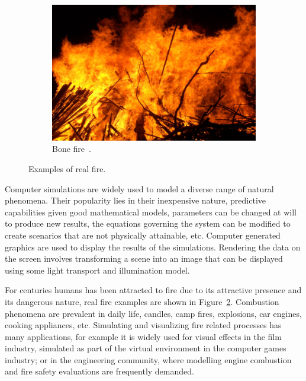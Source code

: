 \begin{figure}[htpb!]
        ~ %
        \begin{subfigure}[t]{0.55\textwidth}
                \includegraphics[width=\textwidth]{img/real_fire2}
                \caption{Bone fire~\cite{real_fire2}.}
                \label{fig:real_fire2}
        \end{subfigure}
        \caption{Examples of real fire.}\label{fig:real_fires}
\end{figure}

Computer simulations are widely used to model a diverse range of natural phenomena.
Their popularity lies in their inexpensive nature, predictive capabilities given good mathematical models, parameters can be changed at will to produce new results, the equations governing the system can be modified to create scenarios that are not physically attainable, etc.
Computer generated graphics are used to display the results of the simulations.
Rendering the data on the screen involves transforming a scene into an image that can be displayed using some light transport and illumination model.

For centuries humans has been attracted to fire due to its attractive presence and its dangerous nature, real fire examples are shown in Figure~\ref{fig:real_fires}.
Combustion phenomena are prevalent in daily life, candles, camp fires, explosions, car engines, cooking appliances, etc.
Simulating and visualizing fire related processes has many applications, for example it is widely used for visual effects in the film industry, simulated as part of the virtual environment in the computer games industry; or in the engineering community, where modelling engine combustion and fire safety evaluations are frequently demanded.

